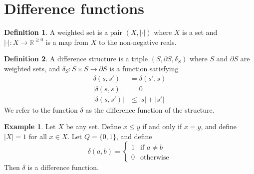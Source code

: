 \documentclass[acmsmall,review,anonymous]{acmart}\settopmatter{printfolios=true,printccs=false,printacmref=false}
\theoremstyle{definition}
\newtheorem{definition}{Definition}
\newtheorem{example}{Example}
\begin{document}
\section{Difference functions}
\begin{definition}
A weighted set is a pair $(X, |\cdot|)$ where $X$ is a set and $|\cdot| : X
\longrightarrow \mathbb{R}^{\geq 0}$ is a map from $X$ to the non-negative
reals.
\end{definition}
\begin{definition}
A difference structure is a triple $(S, \partial S, \delta_S)$ where $S$ and
$\partial S$ are weighted sets, and $\delta_S:
S \times S \longrightarrow \partial S$ is a function satisfying
\begin{align*}
\delta(s, s') &= \delta(s', s)\tag{A1}\\
|\delta(s, s)| &= 0\tag{A2}\\
|\delta(s, s')| &\leq |s| + |s'|\tag{A3}
\end{align*}
We refer to the function $\delta$ as the difference function of the structure.
\end{definition}
\iffalse

\begin{example}
Let $X$ be any set. Define $x \leq y$ if and only if $x=y$, and define $|X|=1$
for all $x \in X$. Let $Q = \{0,1\}$, and define
$$\delta(a, b) = \begin{cases} 1 & \text{if } a \neq b\\
0 & \text{otherwise}
\end{cases}$$
Then $\delta$ is a difference function.
\end{example}
\end{document}
